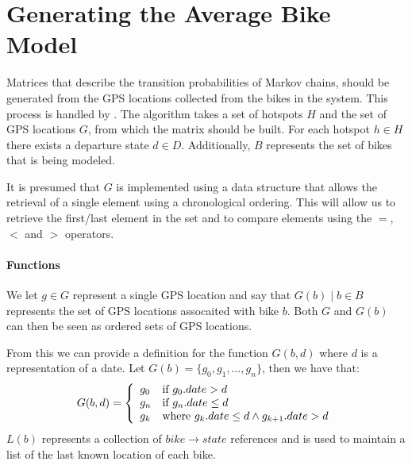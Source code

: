 \section{Generating the Average Bike Model} \label{markov:create_model}
Matrices that describe the transition probabilities of Markov chains, should be generated from the GPS locations collected from the bikes in the system.
This process is handled by .
The algorithm takes a set of hotspots $H$ and the set of GPS locations $G$, from which the matrix should be built.
For each hotspot $h \in H$ there exists a departure state $d \in D$.
Additionally, $B$ represents the set of bikes that is being modeled.

It is presumed that $G$ is implemented using a data structure that allows the retrieval of a single element using a chronological ordering.
This will allow us to retrieve the first/last element in the set and to compare elements using the $=$, $<$ and $>$ operators.

\paragraph{Functions}
We let $g \in G$ represent a single GPS location and say that $G(b) \mid b \in B$ represents the set of GPS locations assocaited with bike $b$.
Both $G$ and $G(b)$ can then be seen as ordered sets of GPS locations.

From this we can provide a definition for the function $G(b, d)$ where $d$ is a representation of a date.
Let $G(b) = \{g_0, g_1, \dots, g_n\}$, then we have that:
\begin{equation}
G(b, d) = 
\left\{
  \begin{array}{l l}
    g_0 & \text{if $g_0.date > d$}\\
    g_n & \text{if $g_n.date \leq d$}\\
    g_k & \text{where $g_k.date \leq d \wedge g_{k+1}.date > d$}
  \end{array} \right.
\end{equation}
$L(b)$ represents a collection of $bike \rightarrow state$ references and is used to maintain a list of the last known location of each bike.

